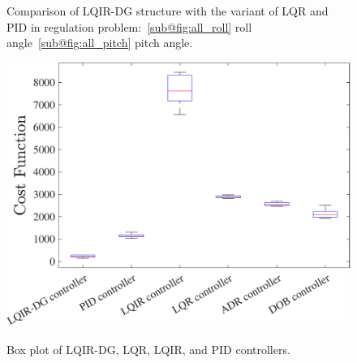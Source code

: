 \documentclass[3p]{elsarticle}
\begin{document}
\begin{figure}[H]
    \centering
    \caption{Comparison of LQIR-DG structure with the variant of LQR and PID in regulation problem:~\ref{sub@fig:all_roll} roll angle~\ref{sub@fig:all_pitch} pitch angle.}
    \label{fig:compare}
\end{figure}

\begin{figure}[H]
    \centering
    {\includegraphics[width=.55\linewidth]{../Figure/implementation/box_plot/lqidgvsboxplot}
    }
    \caption{Box plot of LQIR-DG, LQR, LQIR, and PID controllers.}
    \label{fig:compare_boxplot}
\end{figure}

\newpage
\end{document}
